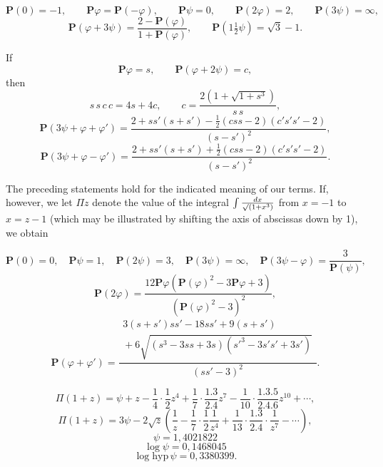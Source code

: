 \clearpage
{}%

\[
\boldsymbol{P}(0)=-1,\qquad \boldsymbol{P}\varphi=\boldsymbol{P}(-\varphi),\qquad
\boldsymbol{P}\psi=0,\qquad \boldsymbol{P}(2\varphi)=2,\qquad \boldsymbol{P}(3\psi)=\infty,
\]
\[
\boldsymbol{P}(\varphi+3\psi)=\frac{2-\boldsymbol{P}(\varphi)}{1+\boldsymbol{P}(\varphi)},
\qquad \boldsymbol{P}(1\tfrac12\psi)=\sqrt{3}-1.
\]

\noindent If
\[
\boldsymbol{P}\varphi=s,\qquad \boldsymbol{P}(\varphi+2\psi)=c,
\]
\noindent then
\[
s\,s\,c\,c=4s+4c,\qquad c=\frac{2(1+\sqrt{1+s^3})}{s\,s},
\]
\[
\boldsymbol{P}(3\psi+\varphi+\varphi')=
\frac{2+s s'(s+s')-\tfrac12(c s s-2)(c' s' s'-2)}{(s-s')^2},
\]
\[
\boldsymbol{P}(3\psi+\varphi-\varphi')=
\frac{2+s s'(s+s')+\tfrac12(c s s-2)(c' s' s'-2)}{(s-s')^2}.
\]



The preceding statements hold for the indicated meaning of our terms. If, however, we let
$\Pi z$ denote the value of the integral $\int \frac{dx}{\mathord{\surd}(1+x^3)}$ from $x=-1$ to $x=z-1$
(which may be illustrated by shifting the axis of abscissas down by 1),
we obtain

\[
\boldsymbol{P}(0)=0,\quad \boldsymbol{P}\psi=1,\quad \boldsymbol{P}(2\psi)=3,\quad
\boldsymbol{P}(3\psi)=\infty,\quad \boldsymbol{P}(3\psi-\varphi)=\frac{3}{\boldsymbol{P}(\psi)},
\]
\[
\boldsymbol{P}(2\varphi)=
\frac{12\boldsymbol{P}\varphi\left(\boldsymbol{P}(\varphi)^2-3\boldsymbol{P}\varphi+3\right)}
{\left(\boldsymbol{P}(\varphi)^2-3\right)^2},
\]
\[
\boldsymbol{P}(\varphi+\varphi')=
\frac{\begin{gathered}3(s+s')s s'-18 s s'+9(s+s')\\{}+6\sqrt{(s^3-3ss+3s)(s'^3-3s's'+3s')}\end{gathered}}{(ss'-3)^2}.
\]



\[
\Pi(1+z)=\psi+z-\frac14\cdot\frac12 z^4+\frac17\cdot\frac{1.3}{2.4}z^7
-\frac{1}{10}\cdot\frac{1.3.5}{2.4.6}z^{10}+\cdots,
\]
\[
\Pi(1+z)=3\psi-2\sqrt{z}\left(\frac1z-\frac17\cdot\frac12\frac{1}{z^4}
+\frac{1}{13}\cdot\frac{1.3}{2.4}\cdot\frac{1}{z^7}-\cdots\right),
\]
\[
\psi=1{,}4021822
\]
\[
\log\psi=0{,}1468045
\]
\[
\log\mathrm{hyp}\,\psi=0{,}3380399.
\]


